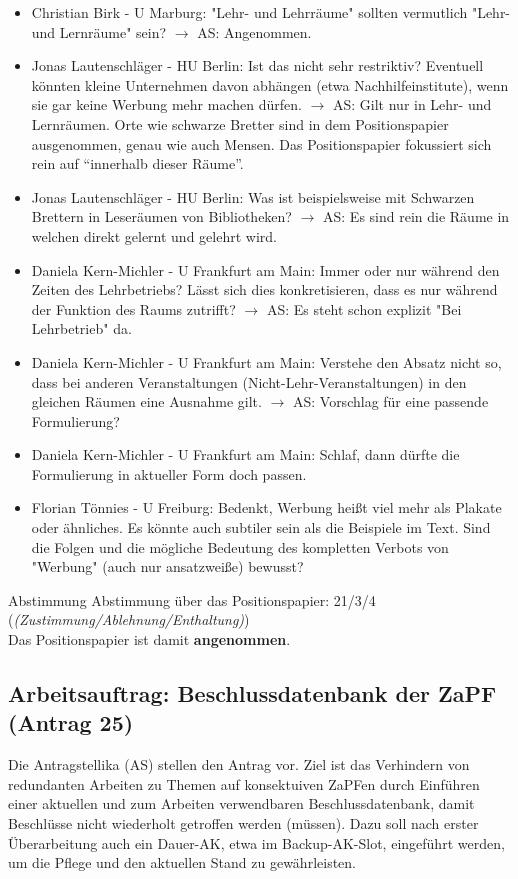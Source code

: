    \begin{itemize}
      \item Christian Birk - U Marburg:  "Lehr- und Lehrräume" sollten vermutlich "Lehr- und Lernräume" sein?
        $\rightarrow$ AS: Angenommen.
      \item Jonas Lautenschläger - HU Berlin:  Ist das nicht sehr restriktiv? Eventuell könnten kleine Unternehmen davon abhängen (etwa Nachhilfeinstitute), wenn sie gar keine Werbung mehr machen dürfen.
        $\rightarrow$ AS: Gilt nur in Lehr- und Lernräumen. Orte wie schwarze Bretter sind in dem Positionspapier ausgenommen, genau wie auch Mensen. Das Positionspapier fokussiert sich rein auf ``innerhalb dieser Räume''.
      \item Jonas Lautenschläger - HU Berlin:  Was ist beispielsweise mit Schwarzen Brettern in Leseräumen von Bibliotheken?
        $\rightarrow$ AS: Es sind rein die Räume in welchen direkt gelernt und gelehrt wird.
      \item Daniela Kern-Michler - U Frankfurt am Main:  Immer oder nur während den Zeiten des Lehrbetriebs? Lässt sich dies konkretisieren, dass es nur während der Funktion des Raums zutrifft?
        $\rightarrow$ AS: Es steht schon explizit "Bei Lehrbetrieb" da.
      \item Daniela Kern-Michler - U Frankfurt am Main:  Verstehe den Absatz nicht so, dass bei anderen Veranstaltungen (Nicht-Lehr-Veranstaltungen) in den gleichen Räumen eine Ausnahme gilt.
        $\rightarrow$ AS: Vorschlag für eine passende Formulierung?
      \item Daniela Kern-Michler - U Frankfurt am Main:  Schlaf, dann dürfte die Formulierung in aktueller Form doch passen.
      \item Florian Tönnies - U Freiburg:  Bedenkt, Werbung heißt viel mehr als Plakate oder ähnliches. Es könnte auch subtiler sein als die Beispiele im Text. Sind die Folgen und die mögliche Bedeutung des kompletten Verbots von "Werbung" (auch nur ansatzweiße) bewusst?
    \end{itemize}

    \begin{success}{Abstimmung}
      Abstimmung über das Positionspapier: 21/3/4 (\textit{(Zustimmung/Ablehnung/Enthaltung)}) \\
      Das Positionspapier ist damit \textbf{angenommen}.
    \end{success}

    \subsection{Arbeitsauftrag: Beschlussdatenbank der ZaPF (Antrag 25)}
    Die Antragstellika (AS) stellen den Antrag vor.
    Ziel ist das Verhindern von redundanten Arbeiten zu Themen auf konsektuiven ZaPFen durch Einführen einer aktuellen und zum Arbeiten verwendbaren Beschlussdatenbank, damit Beschlüsse nicht wiederholt getroffen werden (müssen).
    Dazu soll nach erster Überarbeitung auch ein Dauer-AK, etwa im Backup-AK-Slot, eingeführt werden, um die Pflege und den aktuellen Stand zu gewährleisten.

